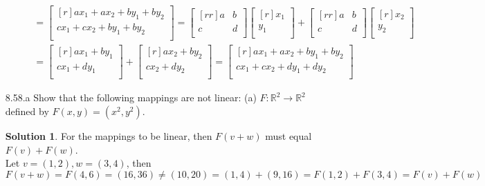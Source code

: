 \documentclass[12pt]{article}
\theoremstyle{definition}
\newtheorem*{solution}{Solution} %
\theoremstyle{plain}
\begin{document}
\begin{enumerate}
\begin{enumerate}
\begin{align*}
	 &= \begin{bmatrix}[r]ax_1+ax_2+by_1+by_2\\cx_1+cx_2+by_1+by_2\\\end{bmatrix} = \begin{bmatrix}[rr]a&b\\c&d\\\end{bmatrix}\begin{bmatrix}[r]x_1\\y_1\\\end{bmatrix}+\begin{bmatrix}[rr]a&b\\c&d\\\end{bmatrix}\begin{bmatrix}[r]x_2\\y_2\\\end{bmatrix}\\
	 &= \begin{bmatrix}[r]ax_1+by_1\\cx_1+dy_1\\\end{bmatrix}+\begin{bmatrix}[r]ax_2+by_2\\cx_2+dy_2\\\end{bmatrix} = \begin{bmatrix}[r]ax_1+ax_2+by_1+by_2\\cx_1+cx_2+dy_1+dy_2\\\end{bmatrix}
	\end{align*}
	\end{enumerate}
	
\item[8.58.a] Show that the following mappings are not linear: (a) $F:\mathbb{R}^2\rightarrow\mathbb{R}^2$ defined by $F(x,y)=(x^2,y^2)$.
	\begin{solution}
	For the mappings to be linear, then $F(v+w)$ must equal $F(v)+F(w)$.\\
	Let $v=(1,2),w=(3,4)$, then
	\[ F(v+w) = F(4,6) = (16,36) \neq (10,20) = (1,4) + (9,16) = F(1,2) + F(3,4) = F(v)+F(w) \]
	\end{solution}


\end{enumerate}
\end{document}
